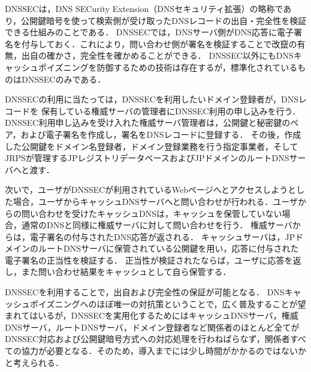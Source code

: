 DNSSECは，DNS SECurity Extension（DNSセキュリティ拡張）の略称であり，公開鍵暗号を使って検索側が受け取ったDNSレコードの出自・完全性を検証できる仕組みのことである．\cite{dnssec}
DNSSECでは，DNSサーバ側がDNS応答に電子署名を付与しておく．これにより，問い合わせ側が署名を検証することで改竄の有無，出自の確かさ，完全性を確かめることができる．
DNSSEC以外にもDNSキャッシュポイズニングを防御するための技術は存在するが，標準化されているものはDNSSECのみである．\cite{RFC2535} \cite{RFC3110} \cite{RFC4033}

DNSSECの利用に当たっては，DNSSECを利用したいドメイン登録者が，DNSレコードを
保有している権威サーバの管理者にDNSSEC利用の申し込みを行う．
DNSSEC利用申し込みを受け入れた権威サーバ管理者は，公開鍵と秘密鍵のペア，および電子署名を作成し，署名をDNSレコードに登録する．
その後，作成した公開鍵をドメイン名登録者，ドメイン登録業務を行う指定事業者，そしてJRPSが管理するJPレジストリデータベースおよびJPドメインのルートDNSサーバへと渡す．

次いで，ユーザがDNSSECが利用されているWebページへとアクセスしようとした場合，ユーザからキャッシュDNSサーバへと問い合わせが行われる．ユーザからの問い合わせを受けたキャッシュDNSは，キャッシュを保管していない場合，通常のDNSと同様に権威サーバに対して問い合わせを行う．
権威サーバからは，電子署名の付与されたDNS応答が返される．
キャッシュサーバは，JPドメインのルートDNSサーバに保管されている公開鍵を用い，応答に付与された電子署名の正当性を検証する．
正当性が検証されたならば，ユーザに応答を返し，また問い合わせ結果をキャッシュとして自ら保管する．

DNSSECを利用することで，出自および完全性の保証が可能となる．\cite{jrps_dnssec}
DNSキャッシュポイズニングへのほぼ唯一の対抗策ということで，広く普及することが望まれてはいるが，DNSSECを実用化するためにはキャッシュDNSサーバ，権威DNSサーバ，ルートDNSサーバ，ドメイン登録者など関係者のほとんど全てがDNSSEC対応および公開鍵暗号方式への対応処理を行わねばらなず，関係者すべての協力が必要となる．そのため，導入までには少し時間がかかるのではないかと考えられる．

